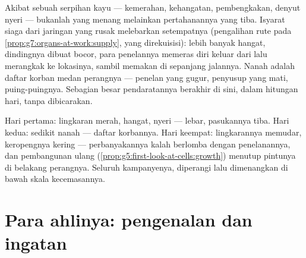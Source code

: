 \begin{proposition}\label{prop:g9:immune-defenses:inflammation}
Akibat sebuah serpihan kayu --- kemerahan, kehangatan,
pembengkakan, denyut nyeri --- bukanlah  yang
menang melainkan pertahanannya yang tiba. Isyarat siaga dari
jaringan yang rusak melebarkan  setempatnya
(pengalihan rute pada \cref{prop:g7:organs-at-work:supply},
yang direkuisisi): lebih banyak  hangat, dindingnya
dibuat bocor, para penelannya memeras diri keluar dari
 lalu merangkak ke lokasinya, sambil memakan
 di sepanjang jalannya. Nanah adalah daftar korban
medan perangnya --- penelan yang gugur, penyusup yang mati,
puing-puingnya. Sebagian besar pendaratannya berakhir di
sini, dalam hitungan hari, tanpa dibicarakan.
\end{proposition}
\admitted

\begin{example}\label{ex:g9:immune-defenses:cut}
Hari pertama: lingkaran merah, hangat, nyeri --- 
lebar, pasukannya tiba. Hari kedua: sedikit nanah --- daftar
korbannya. Hari keempat: lingkarannya memudar, keropengnya
kering --- perbanyakannya kalah berlomba dengan
penelanannya, dan pembangunan ulang 
(\cref{prop:g5:first-look-at-cells:growth}) menutup pintunya
di belakang perangnya. Seluruh kampanyenya, diperangi lalu
dimenangkan di bawah skala kecemasannya.
\end{example}

\section{Para ahlinya: pengenalan dan ingatan}

